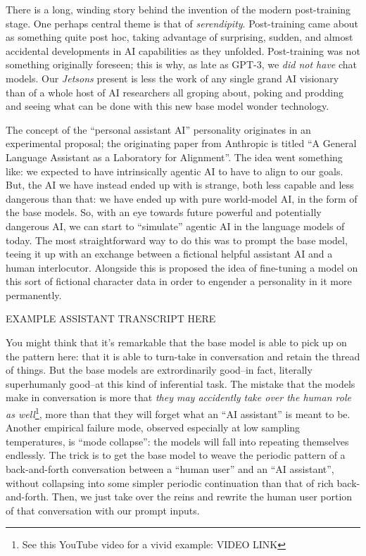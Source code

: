 There is a long, winding story behind the invention of the modern post-training
stage. One perhaps central theme is that of \emph{serendipity}. Post-training
came about as something quite post hoc, taking advantage of surprising, sudden,
and almost accidental developments in AI capabilities as they unfolded.
Post-training was not something originally foreseen; this is why, as late as
GPT-3, we \emph{did not have} chat models. Our \emph{Jetsons} present is less
the work of any single grand AI visionary than of a whole host of AI
researchers all groping about, poking and prodding and seeing what can be done
with this new base model wonder technology.

The concept of the ``personal assistant AI'' personality originates in an
experimental proposal; the originating paper from Anthropic is titled ``A
General Language Assistant as a Laboratory for
Alignment''\cite{askell2021assistant}. The idea went
something like: we expected to have intrinsically agentic AI to have to align
to our goals. But, the AI we have instead ended up with is strange, both less
capable and less dangerous than that: we have ended up with pure world-model
AI, in the form of the base models. So, with an eye towards future powerful and
potentially dangerous AI, we can start to ``simulate'' agentic AI in the
language models of today. The most straightforward way to do this was to prompt
the base model, teeing it up with an exchange between a fictional helpful
assistant AI and a human interlocutor. Alongside this is proposed the idea of
fine-tuning a model on this sort of fictional character data in order to
engender a personality in it more permanently.

EXAMPLE ASSISTANT TRANSCRIPT HERE

You might think that it's remarkable that the base model is able to pick up on
the pattern here: that it is able to turn-take in conversation and retain the
thread of things. But the base models are extrordinarily good--in fact,
literally superhumanly good--at this kind of inferential task. The mistake that
the models make in conversation is more that \emph{they may accidently take
over the human role as well}\footnote{See this YouTube video for a vivid
example: VIDEO LINK}, more than that they will forget what an ``AI assistant''
is meant to be. Another empirical failure mode, observed especially at low
sampling temperatures, is ``mode collapse'': the models will fall into
repeating themselves endlessly. The trick is to get the base model to weave the
periodic pattern of a back-and-forth conversation between a ``human user'' and
an ``AI assistant'', without collapsing into some simpler periodic continuation
than that of rich back-and-forth. Then, we just take over the reins and rewrite
the human user portion of that conversation with our prompt inputs.


